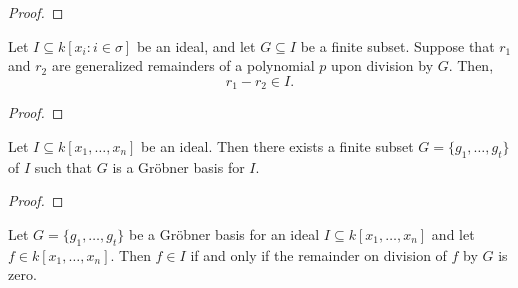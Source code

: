         \begin{proof}
          \leanok
        \end{proof}
        

        \begin{lemma}\label{remainder_sub_remainder_mem_ideal}
          \leanok
          Let \( I \subseteq k[x_i : i \in \sigma] \) be an ideal, and let \( G \subseteq I \) be a finite subset.
Suppose that \( r_1 \) and \( r_2 \) are generalized remainders of a polynomial \( p \) upon division by \( G \).
Then,
\[
r_1 - r_2 \in I.
\]

        \end{lemma}
        
        \begin{proof}
          
          \leanok
        \end{proof}
        

        \begin{lemma}\label{exists_groebner_basis}
          \leanok
          Let \( I \subseteq k[x_1, \ldots, x_n] \) be an ideal. Then there exists a finite subset \( G = \{g_1, \ldots, g_t\} \) of \( I \) such that \( G \) is a Gröbner basis for \( I \).

        \end{lemma}
        
        \begin{proof}
          \leanok
        \end{proof}
        

        \begin{lemma}\label{groebner_basis_isRemainder_zero_iff_mem_span}
          \leanok
          Let \( G = \{g_1, \dots, g_t\} \) be a Gröbner basis for an ideal \( I \subseteq k[x_1, \dots, x_n] \) and let \( f \in k[x_1, \dots, x_n] \). Then \( f \in I \) if and only if the remainder on division of \( f \) by \( G \) is zero.

        \end{lemma}
        
